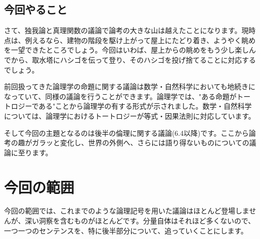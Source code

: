 \documentclass[11pt,a4paper]{jsbook}
\begin{document}
\subsection*{今回やること}
さて、独我論と真理関数の議論で論考の大きな山は越えたことになります。現時点は、例えるなら、建物の階段を駆け上がって屋上にたどり着き、ようやく眺めを一望できたところでしょう。今回はいわば、屋上からの眺めをもう少し楽しんでから、取水塔にハシゴを伝って登り、そのハシゴを投げ捨てることに対応するでしょう。
\par
前回扱ってきた論理学の命題に関する議論は数学・自然科学においても地続きになっていて、同様の議論を行うことができます。論理学では、"ある命題がトートロジーである"ことから論理学の有する形式が示されました。数学・自然科学については、論理学におけるトートロジーが等式・因果法則に対応しています。
\par
そして今回の主題となるのは後半の倫理に関する議論(6.4以降)です。ここから論考の趣がガラッと変化し、世界の外側へ、さらには語り得ないものについての議論に至ります。

\section{今回の範囲}
今回の範囲では、これまでのような論理記号を用いた議論はほとんど登場しませんが、深い洞察を含むものがほとんどです。分量自体はそれほど多くないので、一つ一つのセンテンスを、特に後半部分について、追っていくことにします。
\end{document}
